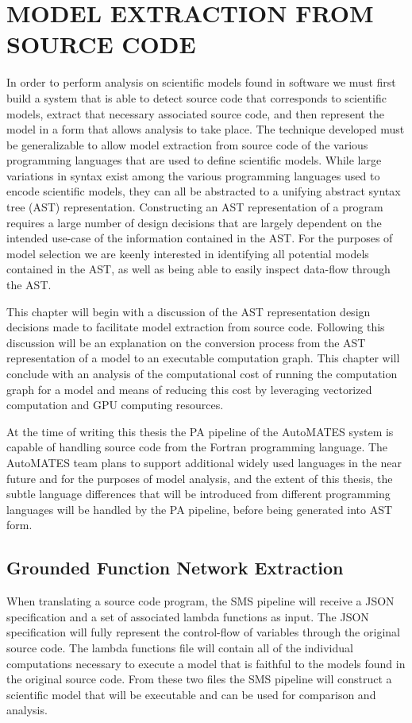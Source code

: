 \chapter{MODEL EXTRACTION FROM SOURCE CODE\label{chapter:extraction}}
In order to perform analysis on scientific models found in software we must first build a system that is able to detect source code that corresponds to scientific models, extract that necessary associated source code, and then represent the model in a form that allows analysis to take place.
The technique developed must be generalizable to allow model extraction from source code of the various programming languages that are used to define scientific models.
While large variations in syntax exist among the various programming languages used to encode scientific models, they can all be abstracted to a unifying abstract syntax tree (AST) representation.
Constructing an AST representation of a program requires a large number of design decisions that are largely dependent on the intended use-case of the information contained in the AST.
For the purposes of model selection we are keenly interested in identifying all potential models contained in the AST, as well as being able to easily inspect data-flow through the AST.

This chapter will begin with a discussion of the AST representation design decisions made to facilitate model extraction from source code.
Following this discussion will be an explanation on the conversion process from the AST representation of a model to an executable computation graph.
This chapter will conclude with an analysis of the computational cost of running the computation graph for a model and means of reducing this cost by leveraging vectorized computation and GPU computing resources.

At the time of writing this thesis the PA pipeline of the AutoMATES system is capable of handling source code from the Fortran programming language.
The AutoMATES team plans to support additional widely used languages in the near future and for the purposes of model analysis, and the extent of this thesis, the subtle language differences that will be introduced from different programming languages will be handled by the PA pipeline, before being generated into AST form.


\section{Grounded Function Network Extraction\label{sec:grfn_extract}}
When translating a source code program, the SMS pipeline will receive a JSON specification and a set of associated lambda functions as input.
The JSON specification will fully represent the control-flow of variables through the original source code.
The lambda functions file will contain all of the individual computations necessary to execute a model that is faithful to the models found in the original source code.
From these two files the SMS pipeline will construct a scientific model that will be executable and can be used for comparison and analysis.

